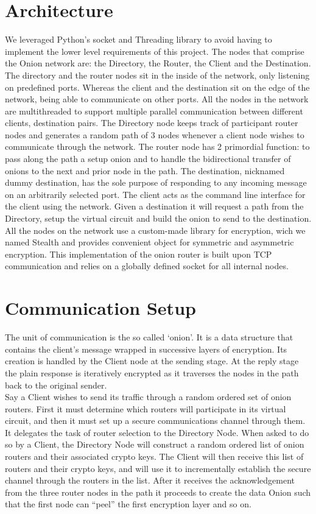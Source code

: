 \documentclass[10pt]{report}
\begin{document}
\section{Architecture}
We leveraged Python’s socket and Threading library to avoid having to implement the lower level requirements of this project.
The nodes that comprise the Onion network are: the Directory, the Router, the Client and the Destination.  
The directory and the router nodes sit in the inside of the network, only listening on predefined ports. 
Whereas the client and the destination sit on the edge of the network, being able to communicate on other ports.
All the nodes in the network are multithreaded to support multiple parallel communication between different clients, destination pairs.
The Directory node keeps track of participant router nodes and generates a random path of 3 nodes whenever a client node wishes to communicate through the network.
The router node has 2 primordial function: to pass along the path a setup onion and to handle the bidirectional transfer of onions to the next and prior node in the path. 
The destination, nicknamed dummy destination, has the sole purpose of responding to any incoming message on an arbitrarily selected port. 
The client acts as the command line interface for the client using the network. Given a destination it will request a path from the Directory, setup the virtual circuit and build the onion to send to the destination.
All the nodes on the network use a custom-made library for encryption, wich we named Stealth and provides convenient object for symmetric and asymmetric encryption.
This implementation of the onion router is built upon TCP communication and relies on a globally defined socket for all internal nodes.


\section{Communication Setup}
The unit of communication is the so called ‘onion’. It is a data structure that contains the client’s message wrapped in successive layers of encryption. 
Its creation is handled by the Client node at the sending stage. At the reply stage the plain response is iteratively encrypted as it traverses the nodes in the path back to the original sender. \\

\noindent Say a Client wishes to send its traffic through a random ordered set of onion routers.  
First it must determine which routers will participate in its virtual circuit, and then it must set up a secure communications channel through them.   
It delegates the task of router selection to the Directory Node.  When asked to do so by a Client, the Directory Node will construct a random ordered list of onion routers and their associated crypto keys.  
The Client will then receive this list of routers and their crypto keys, and will use it to incrementally establish the secure channel through the routers in the list. 
After it receives the acknowledgement from the three router nodes in the path it proceeds to create the data Onion such that the first node can “peel” the first encryption layer and so on.  \\
\end{document}
